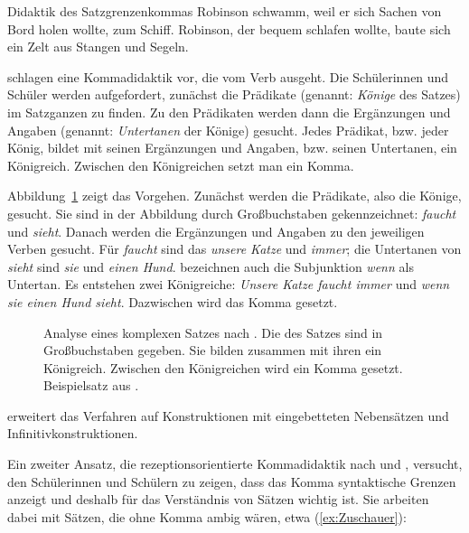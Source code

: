 \begin{Exkurs}{Didaktik des Satzgrenzenkommas}
\ea \label{Robinson3}
\ea Robinson schwamm, weil er sich Sachen von Bord holen wollte, zum Schiff.\label{Robinson31}
\ex Robinson, der bequem schlafen wollte, baute sich ein Zelt aus Stangen und Segeln.\label{Robinson32}
\z
\z

\citet{LindauerSutter2005} schlagen eine Kommadidaktik vor, die vom Verb ausgeht. Die Schülerinnen und Schüler werden aufgefordert, zunächst die Prädikate (genannt: \textit{Könige} des Satzes) im Satzganzen zu finden. Zu den Prädikaten werden dann die Ergänzungen und Angaben (genannt: \textit{Untertanen} der Könige) gesucht. Jedes Prädikat, bzw. jeder König, bildet mit seinen Ergänzungen und Angaben, bzw. seinen Untertanen, ein Königreich. Zwischen den Königreichen setzt man ein Komma.

Abbildung~\ref{fig:Koenigreichmodell} zeigt das Vorgehen. Zunächst werden die Prädikate, also die Könige, gesucht. Sie sind in der Abbildung durch Großbuchstaben gekennzeichnet: \textit{faucht} und \textit{sieht}. Danach werden die Ergänzungen und Angaben zu den jeweiligen Verben gesucht. Für \textit{faucht} sind das \textit{unsere Katze} und \textit{immer}; die Untertanen von \textit{sieht} sind \textit{sie} und \textit{einen Hund}. \citet{LindauerSutter2005} bezeichnen auch die Subjunktion \textit{wenn} als Untertan. Es entstehen zwei Königreiche: \textit{Unsere Katze faucht immer} und \textit{wenn sie einen Hund sieht}. Dazwischen wird das Komma gesetzt.


\begin{figure}
\caption{\label{fig:Koenigreichmodell} Analyse eines komplexen Satzes nach \citet{LindauerSutter2005}. Die  des Satzes sind in Großbuchstaben gegeben. Sie bilden zusammen mit ihren  ein Königreich. Zwischen den Königreichen wird ein Komma gesetzt. Beispielsatz aus \citet[603]{Lindauer2011}. }
\end{figure}

\citet{Lindauer2011} erweitert das Verfahren auf Konstruktionen mit eingebetteten Nebensätzen und Infinitivkonstruktionen.

Ein zweiter Ansatz, die rezeptionsorientierte Kommadidaktik nach \citet{Esslinger2014} und \citet{Gorschlueter2001}, versucht, den Schülerinnen und Schülern zu zeigen, dass das Komma syntaktische Grenzen anzeigt und deshalb für das Verständnis von Sätzen wichtig ist. Sie arbeiten dabei mit Sätzen, die ohne Komma ambig wären, etwa (\ref{ex:Zuschauer}):


\end{Exkurs}
